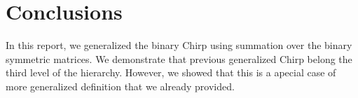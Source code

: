 \section{Conclusions}
\label{Sec:Con}
In this report, we generalized the binary Chirp using summation over the binary symmetric matrices. We demonstrate that previous generalized Chirp belong the third level of the hierarchy. However, we showed that this is a apecial case of more generalized definition that we already provided.